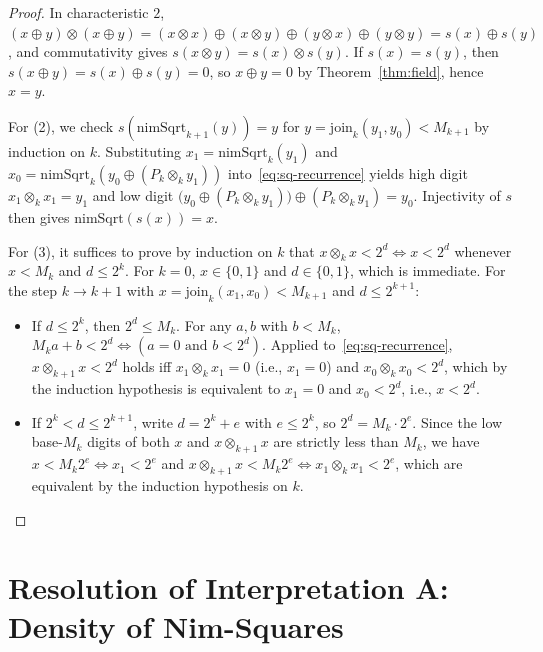 \documentclass[11pt]{article}
\theoremstyle{definition}
\theoremstyle{remark}
\newcommand{\nimadd}{\oplus}
\newcommand{\nimmul}{\otimes}
\begin{document}
\begin{proof}
In characteristic $2$, $(x \nimadd y) \nimmul (x \nimadd y) = (x \nimmul x) \nimadd (x \nimmul y) \nimadd (y \nimmul x) \nimadd (y \nimmul y) = s(x) \nimadd s(y)$, and commutativity gives $s(x \nimmul y) = s(x) \nimmul s(y)$. If $s(x) = s(y)$, then $s(x \nimadd y) = s(x) \nimadd s(y) = 0$, so $x \nimadd y = 0$ by Theorem~\ref{thm:field}, hence $x = y$.

For (2), we check $s(\mathrm{nimSqrt}_{k+1}(y)) = y$ for $y = \mathrm{join}_k(y_1, y_0) < M_{k+1}$ by induction on $k$. Substituting $x_1 = \mathrm{nimSqrt}_k(y_1)$ and $x_0 = \mathrm{nimSqrt}_k(y_0 \nimadd (P_k \nimmul_k y_1))$ into~\eqref{eq:sq-recurrence} yields high digit $x_1 \nimmul_k x_1 = y_1$ and low digit $\bigl(y_0 \nimadd (P_k \nimmul_k y_1)\bigr) \nimadd (P_k \nimmul_k y_1) = y_0$. Injectivity of $s$ then gives $\mathrm{nimSqrt}(s(x)) = x$.

For (3), it suffices to prove by induction on $k$ that $x \nimmul_k x < 2^d \iff x < 2^d$ whenever $x < M_k$ and $d \le 2^k$. For $k = 0$, $x \in \{0,1\}$ and $d \in \{0,1\}$, which is immediate. For the step $k \to k+1$ with $x = \mathrm{join}_k(x_1, x_0) < M_{k+1}$ and $d \le 2^{k+1}$:
\begin{itemize}
  \item If $d \le 2^k$, then $2^d \le M_k$. For any $a, b$ with $b < M_k$, $M_k a + b < 2^d \iff (a = 0 \text{ and } b < 2^d)$. Applied to~\eqref{eq:sq-recurrence}, $x \nimmul_{k+1} x < 2^d$ holds iff $x_1 \nimmul_k x_1 = 0$ (i.e., $x_1 = 0$) and $x_0 \nimmul_k x_0 < 2^d$, which by the induction hypothesis is equivalent to $x_1 = 0$ and $x_0 < 2^d$, i.e., $x < 2^d$.
  \item If $2^k < d \le 2^{k+1}$, write $d = 2^k + e$ with $e \le 2^k$, so $2^d = M_k \cdot 2^e$. Since the low base-$M_k$ digits of both $x$ and $x \nimmul_{k+1} x$ are strictly less than $M_k$, we have $x < M_k 2^e \iff x_1 < 2^e$ and $x \nimmul_{k+1} x < M_k 2^e \iff x_1 \nimmul_k x_1 < 2^e$, which are equivalent by the induction hypothesis on $k$. \qedhere
\end{itemize}
\end{proof}

\section{Resolution of Interpretation A: Density of Nim-Squares}
\end{document}
